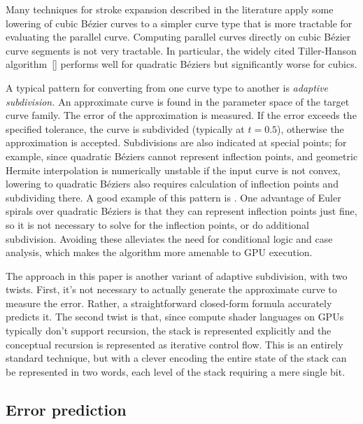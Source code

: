 \documentclass[sigconf, nonacm]{acmart}
\begin{document}
Many techniques for stroke expansion described in the literature apply some lowering of cubic Bézier curves to a simpler curve type that is more tractable for evaluating the parallel curve. Computing parallel curves directly on cubic Bézier curve segments is not very tractable. In particular, the widely cited Tiller-Hanson algorithm~[] performs well for quadratic Béziers but significantly worse for cubics.


A typical pattern for converting from one curve type to another is \emph{adaptive subdivision.} An approximate curve is found in the parameter space of the target curve family. The error of the approximation is measured. If the error exceeds the specified tolerance, the curve is subdivided (typically at $t = 0.5$), otherwise the approximation is accepted. Subdivisions are also indicated at special points; for example, since quadratic Béziers cannot represent inflection points, and geometric Hermite interpolation is numerically unstable if the input curve is not convex, lowering to quadratic Béziers also requires calculation of inflection points and subdividing there. A good example of this pattern is \citet{Nehab2020}. One advantage of Euler spirals over quadratic Béziers is that they can represent inflection points just fine, so it is not necessary to solve for the inflection points, or do additional subdivision. Avoiding these alleviates the need for conditional logic and case analysis, which makes the algorithm more amenable to GPU execution.

The approach in this paper is another variant of adaptive subdivision, with two twists. First, it's not necessary to actually generate the approximate curve to measure the error. Rather, a straightforward closed-form formula accurately predicts it. The second twist is that, since compute shader languages on GPUs typically don't support recursion, the stack is represented explicitly and the conceptual recursion is represented as iterative control flow. This is an entirely standard technique, but with a clever encoding the entire state of the stack can be represented in two words, each level of the stack requiring a mere single bit.

\subsection{Error prediction}
\end{document}

